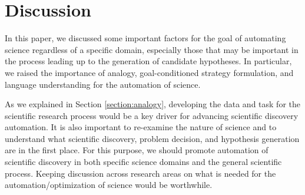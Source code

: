 \documentclass{article}
\begin{document}
\section{Discussion}
In this paper, we discussed some important factors for the goal of automating science regardless of a specific domain, especially those that may be important in the process leading up to the generation of candidate hypotheses. In particular, we raised the importance of analogy, goal-conditioned strategy formulation, and language understanding for the automation of science.

As we explained in Section \ref{section:analogy}, developing the data and task for the scientific research process would be a key driver for advancing scientific discovery automation. It is also important to re-examine the nature of science and to understand what scientific discovery, problem decision, and hypothesis generation are in the first place. For this purpose, we should promote automation of scientific discovery in both specific science domains and the general scientific process. Keeping discussion across research areas on what is needed for the automation/optimization of science would be worthwhile.




\end{document}
